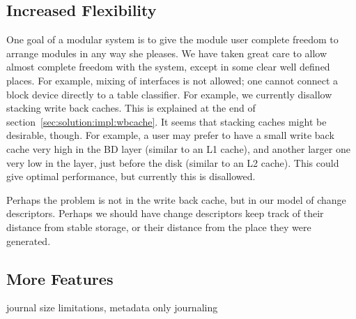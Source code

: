 \subsection{Increased Flexibility}


One goal of a modular system is to give the module user complete freedom to
arrange modules in any way she pleases. We have taken great care to allow
almost complete freedom with the system, except in some clear well defined
places. For example, mixing of interfaces is not allowed; one cannot
connect a block device directly to a table classifier. For example, we
currently disallow stacking write back caches. This is explained at the end
of section~\ref{sec:solution:impl:wbcache}. It seems that stacking caches
might be desirable, though. For example, a user may prefer to have a small
write back cache very high in the BD layer (similar to an L1 cache), and
another larger one very low in the layer, just before the disk (similar to
an L2 cache). This could give optimal performance, but currently this is
disallowed.

Perhaps the problem is not in the write back cache, but in our model of change
descriptors. Perhaps we should have change descriptors keep track of their
distance from stable storage, or their distance from the place they were
generated.

\subsection{More Features}
journal size limitations, metadata only journaling
